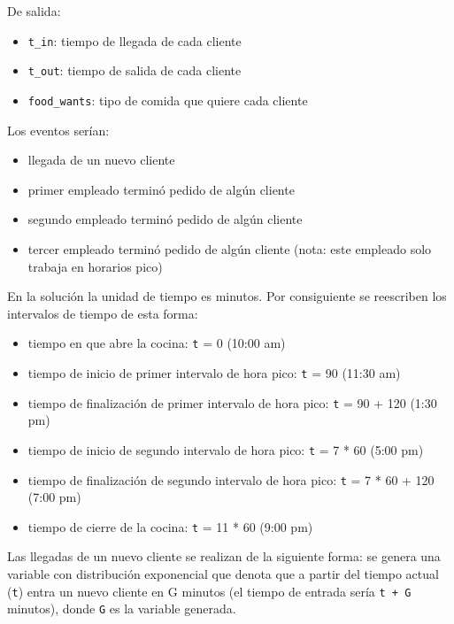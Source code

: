 \documentclass{article}
\begin{document}
        De salida:

        \begin{itemize}[label=\textbullet]
            \item \texttt{t\_in}: tiempo de llegada de cada cliente
            \item \texttt{t\_out}: tiempo de salida de cada cliente
            \item \texttt{food\_wants}: tipo de comida que quiere cada cliente
        \end{itemize}

        Los eventos serían:

        \begin{itemize}[label=\textbullet]
            \item llegada de un nuevo cliente
            \item primer empleado terminó pedido de algún cliente
            \item segundo empleado terminó pedido de algún cliente
            \item tercer empleado terminó pedido de algún cliente (nota: este empleado solo trabaja en horarios pico)
        \end{itemize}

        En la solución la unidad de tiempo es minutos. Por consiguiente se reescriben los intervalos de tiempo de esta forma:

        \begin{itemize}[label=\textbullet]
            \item tiempo en que abre la cocina: \texttt{t} = 0 (10:00 am)
            \item tiempo de inicio de primer intervalo de hora pico: \texttt{t} = 90 (11:30 am)
            \item tiempo de finalización de primer intervalo de hora pico: \texttt{t} = 90 + 120 (1:30 pm)
            \item tiempo de inicio de segundo intervalo de hora pico: \texttt{t} = 7 * 60 (5:00 pm)
            \item tiempo de finalización de segundo intervalo de hora pico: \texttt{t} = 7 * 60 + 120 (7:00 pm)
            \item tiempo de cierre de la cocina: \texttt{t} = 11 * 60 (9:00 pm)
        \end{itemize}

        Las llegadas de un nuevo cliente se realizan de la siguiente forma: se genera una variable con distribución exponencial
        que denota que a partir del tiempo actual (\texttt{t}) entra un nuevo cliente en G minutos (el tiempo de entrada sería \texttt{t + G} minutos),
        donde \texttt{G} es la variable generada.
\end{document}
